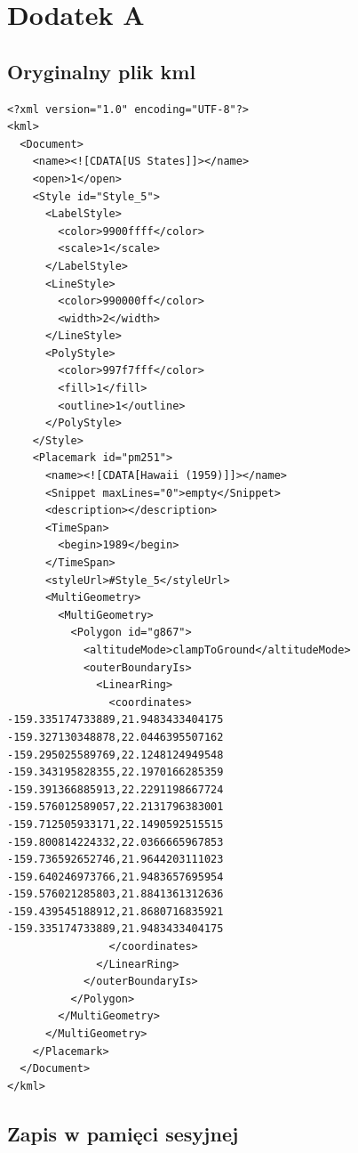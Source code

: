﻿\chapter{Dodatek A}
\label{cha:appa}

\section{Oryginalny plik kml}
\label{sec:akml}

\lstset{language=XML}
\begin{lstlisting}[caption=caption]
<?xml version="1.0" encoding="UTF-8"?>
<kml>
  <Document>
    <name><![CDATA[US States]]></name>
    <open>1</open>
    <Style id="Style_5">
      <LabelStyle>
        <color>9900ffff</color>
        <scale>1</scale>
      </LabelStyle>
      <LineStyle>
        <color>990000ff</color>
        <width>2</width>
      </LineStyle>
      <PolyStyle>
        <color>997f7fff</color>
        <fill>1</fill>
        <outline>1</outline>
      </PolyStyle>
    </Style>
    <Placemark id="pm251">
      <name><![CDATA[Hawaii (1959)]]></name>
      <Snippet maxLines="0">empty</Snippet>
      <description></description>
      <TimeSpan>
        <begin>1989</begin>
      </TimeSpan>
      <styleUrl>#Style_5</styleUrl>
      <MultiGeometry>
        <MultiGeometry>
          <Polygon id="g867">
            <altitudeMode>clampToGround</altitudeMode>
            <outerBoundaryIs>
              <LinearRing>
                <coordinates>
-159.335174733889,21.9483433404175
-159.327130348878,22.0446395507162
-159.295025589769,22.1248124949548
-159.343195828355,22.1970166285359
-159.391366885913,22.2291198667724
-159.576012589057,22.2131796383001
-159.712505933171,22.1490592515515
-159.800814224332,22.0366665967853
-159.736592652746,21.9644203111023
-159.640246973766,21.9483657695954
-159.576021285803,21.8841361312636
-159.439545188912,21.8680716835921
-159.335174733889,21.9483433404175
                </coordinates>
              </LinearRing>
            </outerBoundaryIs>
          </Polygon>
        </MultiGeometry>
      </MultiGeometry>
    </Placemark>
  </Document>
</kml>

\end{lstlisting}

\section{Zapis w pamięci sesyjnej}
\label{sec:ass}


